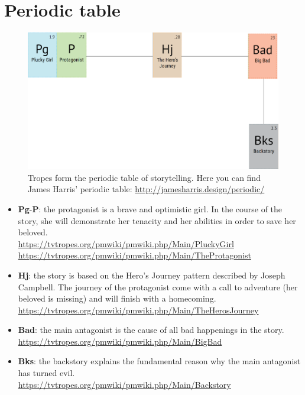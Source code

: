 \section{Periodic table}

\begin{figure}[H]
  \centering
  \includegraphics[width=\textwidth]{Images/Diagrams/periodicTable}
  \caption{Tropes form the periodic table of storytelling. Here you can find James Harris' periodic table: \url{http://jamesharris.design/periodic/}}
\end{figure}

\begin{itemize}
\item \textbf{Pg}-\textbf{P}: the protagonist is a brave and optimistic girl. In the course of the story, she will demonstrate her tenacity and her abilities in order to save her beloved.\\
\url{https://tvtropes.org/pmwiki/pmwiki.php/Main/PluckyGirl}\\
\url{https://tvtropes.org/pmwiki/pmwiki.php/Main/TheProtagonist}

\item \textbf{Hj}: the story is based on the Hero's Journey pattern described by Joseph Campbell. The journey of the protagonist come with a call to adventure (her beloved is missing) and will finish with a homecoming.\\
\url{https://tvtropes.org/pmwiki/pmwiki.php/Main/TheHerosJourney}

\item \textbf{Bad}: the main antagonist is the cause of all bad happenings in the story.\\
\url{https://tvtropes.org/pmwiki/pmwiki.php/Main/BigBad}

\item \textbf{Bks}: the backstory explains the fundamental reason why the main antagonist has turned evil.\\
\url{https://tvtropes.org/pmwiki/pmwiki.php/Main/Backstory}
\end{itemize}
